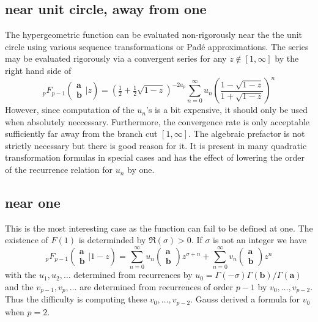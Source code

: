 \documentclass[12pt]{article}
\numberwithin{equation}{section}
\newcommand{\FF}[6] {{}_{#1}{#2}_{#3} \left( \begin{array}{c} #4 \\ #5 \end{array} \Big| #6  \right)}
\begin{document}
\subsection{near unit circle, away from one}
The hypergeometric function can be evaluated non-rigorously near the the unit circle using various sequence transformations or Pad\'e approximations. The series may be evaluated rigorously via a convergent series for any $z \not \in [1,\infty]$ by the right hand side of
\begin{equation}
\label{balanced_anywhere}
\FF{p}{F}{p-1}{\mathbf{a}}{\mathbf{b}}{z} = (\tfrac12+ \tfrac12 \sqrt{1-z})^{-2 a_p} \sum_{n=0}^{\infty}u_n \left(\frac{1-\sqrt{1-z}}{1+\sqrt{1-z}}\right)^n
\end{equation}
However, since computation of the $u_n$'s is a bit expensive, it should only be used when absolutely neccessary. Furthermore, the convergence rate is only acceptable sufficiently far away from the branch cut $[1,\infty]$. The algebraic prefactor is not strictly necessary but there is good reason for it. It is present in many quadratic transformation formulas in special cases and has the effect of lowering the order of the recurrence relation for $u_n$ by one.

\subsection{near one}

This is the most interesting case as the function can fail to be defined at one. The existence of $F(1)$ is determinded by $\Re(\sigma)> 0$. If $\sigma$ is not an integer we have
\begin{equation}
\label{nearone}
\FF{p}{F}{p-1}{\mathbf{a}}{\mathbf{b}}{1-z} = \sum_{n=0}^{\infty} u_n \left(\begin{array}{c} \mathbf{a}\\\mathbf{b}\end{array} \right) z^{\sigma+n} + \sum_{n=0}^{\infty} v_n \left(\begin{array}{c} \mathbf{a}\\\mathbf{b}\end{array} \right) z^n
\end{equation}
with the $u_1,u_2,\dots$ determined from recurrences by $u_0 = \Gamma(-\sigma)\Gamma(\mathbf{b})/\Gamma(\mathbf{a})$ and the $v_{p-1}, v_p, \dots$ are determined from recurrences of order $p-1$ by $v_0, \dots, v_{p-2}$. Thus the difficulty is computing these $v_0, \dots, v_{p-2}$. Gauss derived a formula for $v_0$ when $p=2$.
\end{document}
